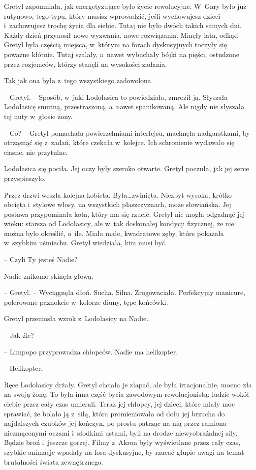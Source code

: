 \documentclass[oneside,polish,11pt,sfheadings]{mwbk}
\begin{document}
Gretyl zapomniała, jak energetyzujące było życie rewolucyjne. W~Gary
było już rutynowo, tego typu, który musisz wprowadzić, jeśli wychowujesz
dzieci i~zachowujesz trochę życia dla siebie. Tutaj nie było dwóch
takich samych dni. Każdy dzień przynosił nowe wyzwania, nowe
rozwiązania. Minęły lata, odkąd Gretyl była częścią miejsca, w~którym na
forach dyskusyjnych toczyły się poważne kłótnie. Tutaj szalały, a~nawet
wybuchały bójki na pięści, ostudzone przez rozjemców, którzy stanęli na
wysokości zadania.

Tak jak ona była z~tego wszystkiego zadowolona.

-- Gretyl. -- Sposób, w~jaki Lodołasica to powiedziała, zmroził ją.
Słyszała Lodołasicę smutną, przestraszoną, a~nawet spanikowaną. Ale
nigdy nie słyszała tej nuty w~głosie żony.

-- Co? -- Gretyl pomachała powierzchniami interfejsu, machnęła
nadgarstkami, by otrząsnąć się z~zadań, które czekała w~kolejce. Ich
schronienie wydawało się ciasne, nie przytulne.

Lodołasica się pociła. Jej oczy były szeroko otwarte. Gretyl poczuła,
jak jej serce przyspieszyło.

Przez drzwi weszła kolejna kobieta. Była\ldots  zwinięta. Niezbyt wysoka,
krótko obcięta i~stylowe włosy, na wszystkich płaszczyznach, może
słowiańska. Jej postawa przypominała kota, który ma się rzucić. Gretyl
nie mogła odgadnąć jej wieku: starsza od Lodołasicy, ale w~tak
doskonałej kondycji fizycznej, że nie można było określić, o~ile. Miała
małe, kwadratowe zęby, które pokazała w~szybkim uśmiechu. Gretyl
wiedziała, kim musi być.

-- Czyli Ty jesteś Nadie?

Nadie znikomo skinęła głową. 

-- Gretyl. -- Wyciągnęła dłoń. Sucha. Silna.
Zrogowaciała. Perfekcyjny manicure, polerowane paznokcie w~kolorze
diuny, tępe końcówki.

Gretyl przeniosła wzrok z~Lodołasicy na Nadie.

-- Jak źle?

-- Limpopo przyprowadza chłopców. Nadie ma helikopter.

-- Helikopter.

Ręce Lodołasicy drżały. Gretyl chciała je złapać, ale była
irracjonalnie, mocno zła na swoją żonę. To była inna część bycia
zawodowym rewolucjonistą: ludzie wokół ciebie przez cały czas umierali.
Teraz jej chłopcy, jej dzieci, które miały moc sprawiać, że bolało ją z~siłą, która promieniowała od dołu jej brzucha do najdalszych czubków jej
kończyn, po prostu patrząc na nią przez ramiona niezmąconymi oczami i~słodkimi ustami, byli na drodze niewyobrażalnej siły. Będzie broń i~jeszcze gorzej. Filmy z~Akron były wyświetlane przez cały czas, szybkie
animacje wpadały na fora dyskusyjne, by rzucać głupie uwagi na temat
brutalności świata zewnętrznego.
\end{document}
